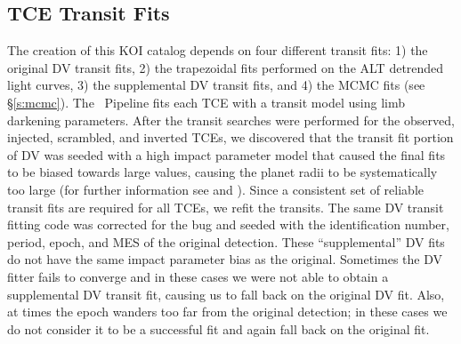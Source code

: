 \vspace{3em}
\subsection{TCE Transit Fits}
\label{s:fits}
The creation of this KOI catalog depends on four different transit fits: 1) the original DV transit fits, 2) the trapezoidal fits performed on the ALT \citet{Garcia2010} detrended light curves, 3) the supplemental DV transit fits, and 4) the MCMC fits (see \S\ref{s:mcmc}).  The \Kepler\ Pipeline fits each TCE with a \citet{Mandel2002} transit model using \citet{Claret2000} limb darkening parameters. After the transit searches were performed for the observed, injected, scrambled, and inverted TCEs, we discovered that the transit fit portion of DV was seeded with a high impact parameter model that caused the final fits to be biased towards large values, causing the planet radii to be systematically too large (for further information see \citealt{Christiansen2017} and \citealt{Coughlin2017a}). Since a consistent set of reliable transit fits are required for all TCEs, we refit the transits.  The same DV transit fitting code was corrected for the bug and seeded with the \Kepler{} identification number, period, epoch, and MES of the original detection. These ``supplemental'' DV fits do not have the same impact parameter bias as the original.  Sometimes the DV fitter fails to converge and in these cases we were not able to obtain a supplemental DV transit fit, causing us to fall back on the original DV fit. Also, at times the epoch wanders too far from the original detection; in these cases we do not consider it to be a successful fit and again fall back on the original fit.

